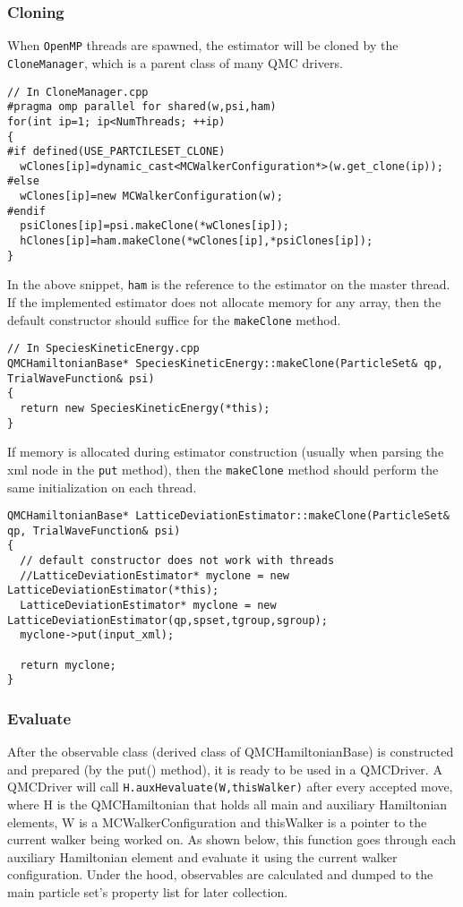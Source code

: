 \documentclass[aps,prl,preprint]{revtex4-1}
\begin{document}
\subsubsection{Cloning}
When \verb|OpenMP| threads are spawned, the estimator will be cloned by the \verb|CloneManager|, which is a parent class of many QMC drivers. 
\begin{lstlisting}
// In CloneManager.cpp
#pragma omp parallel for shared(w,psi,ham)
for(int ip=1; ip<NumThreads; ++ip)
{
#if defined(USE_PARTCILESET_CLONE)
  wClones[ip]=dynamic_cast<MCWalkerConfiguration*>(w.get_clone(ip));
#else
  wClones[ip]=new MCWalkerConfiguration(w);
#endif
  psiClones[ip]=psi.makeClone(*wClones[ip]);
  hClones[ip]=ham.makeClone(*wClones[ip],*psiClones[ip]);
}
\end{lstlisting}
In the above snippet, \verb|ham| is the reference to the estimator on the master thread. If the implemented estimator does not allocate memory for any array, then the default constructor should suffice for the \verb|makeClone| method.
\begin{lstlisting}
// In SpeciesKineticEnergy.cpp
QMCHamiltonianBase* SpeciesKineticEnergy::makeClone(ParticleSet& qp, TrialWaveFunction& psi)
{
  return new SpeciesKineticEnergy(*this);
}
\end{lstlisting}
If memory is allocated during estimator construction (usually when parsing the xml node in the \verb|put| method), then the \verb|makeClone| method should perform the same initialization on each thread.
\begin{lstlisting}
QMCHamiltonianBase* LatticeDeviationEstimator::makeClone(ParticleSet& qp, TrialWaveFunction& psi)
{
  // default constructor does not work with threads
  //LatticeDeviationEstimator* myclone = new LatticeDeviationEstimator(*this); 
  LatticeDeviationEstimator* myclone = new LatticeDeviationEstimator(qp,spset,tgroup,sgroup);
  myclone->put(input_xml);

  return myclone;
}
\end{lstlisting}

\subsubsection{Evaluate}
After the observable class (derived class of QMCHamiltonianBase) is constructed and prepared (by the put() method), it is ready to be used in a QMCDriver. A QMCDriver will call \verb|H.auxHevaluate(W,thisWalker)| after every accepted move, where H is the QMCHamiltonian that holds all main and auxiliary Hamiltonian elements, W is a MCWalkerConfiguration and thisWalker is a pointer to the current walker being worked on. As shown below, this function goes through each auxiliary Hamiltonian element and evaluate it using the current walker configuration. Under the hood, observables are calculated and dumped to the main particle set's property list for later collection.
\end{document}
